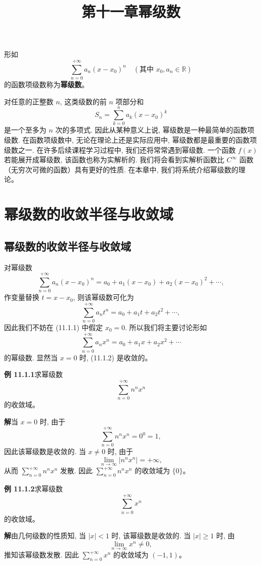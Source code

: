 \documentclass[UTF8, 12pt, fontset=fandol, oneside]{ctexart}
\title{第十一章\quad 幂级数}
\author{}
\date{}
\begin{document}
\maketitle

形如
\[
  \sum_{n=0}^{+\infty}a_n(x-x_0)^n
  \quad(\text{其中 }x_0,a_n\in\mathbb R)
\]
的函数项级数称为\textbf{幂级数}。

对任意的正整数 $n$, 这类级数的前 $n$ 项部分和
\[
  S_n=\sum_{k=0}^{n}a_k(x-x_0)^k
\]
是一个至多为 $n$ 次的多项式. 因此从某种意义上说, 幂级数是一种最简单的函数项级数. 在函数项级数中, 无论在理论上还是实际应用中, 幂级数都是最重要的函数项级数之一. 在许多后续课程学习过程中, 我们还将常常遇到幂级数. 一个函数 $f(x)$ 若能展开成幂级数, 该函数也称为实解析的. 我们将会看到实解析函数比 $C^\infty$ 函数（无穷次可微的函数）具有更好的性质. 在本章中, 我们将系统介绍幂级数的理论。

\section{幂级数的收敛半径与收敛域}

\subsection{幂级数的收敛半径与收敛域}

对幂级数
\begin{equation}
  \sum_{n=0}^{+\infty}a_n(x-x_0)^n
  =a_0+a_1(x-x_0)+a_2(x-x_0)^2+\cdots ,
  \tag{11.1.1}
\end{equation}
作变量替换 $t=x-x_0$, 则该幂级数可化为
\[
  \sum_{n=0}^{+\infty}a_nt^n=a_0+a_1t+a_2t^2+\cdots ,
\]
因此我们不妨在 (11.1.1) 中假定 $x_0=0$. 所以我们将主要讨论形如
\begin{equation}
  \sum_{n=0}^{+\infty}a_nx^n=a_0+a_1x+a_2x^2+\cdots
  \tag{11.1.2}
\end{equation}
的幂级数. 显然当 $x=0$ 时, (11.1.2) 是收敛的。

\noindent\textbf{例 11.1.1}\quad 求幂级数
\[
  \sum_{n=0}^{+\infty}n^nx^n
\]
的收敛域。

\noindent\textbf{解}\quad 当 $x=0$ 时, 由于
\[
  \sum_{n=0}^{+\infty}n^nx^n=0^0=1,
\]
因此该幂级数是收敛的. 当 $x\ne0$ 时, 由于
\[
  \lim_{n\to\infty}|n^nx^n|=+\infty,
\]
从而 $\sum_{n=0}^{+\infty}n^nx^n$ 发散. 因此 $\sum_{n=0}^{+\infty}n^nx^n$ 的收敛域为 $\{0\}$。

\noindent\textbf{例 11.1.2}\quad 求幂级数
\[
  \sum_{n=0}^{+\infty}x^n
\]
的收敛域。

\noindent\textbf{解}\quad 由几何级数的性质知, 当 $|x|<1$ 时, 该幂级数是收敛的. 当 $|x|\geqslant1$ 时, 由
\[
  \lim_{n\to\infty}x^n\ne0,
\]
推知该幂级数发散. 因此 $\sum_{n=0}^{+\infty}x^n$ 的收敛域为 $(-1,1)$。
\end{document}
